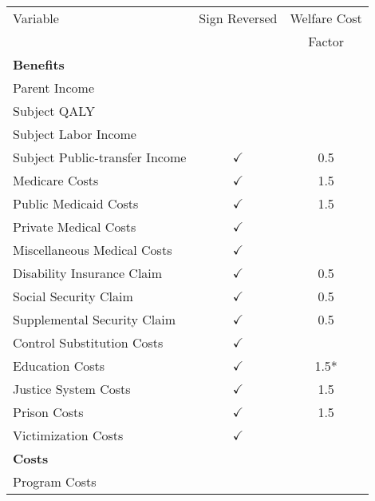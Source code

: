 \begin{tabular}{l c c}
\toprule			
Variable & Sign Reversed	& Welfare Cost \\
	&		& Factor \\
\midrule
\textbf{Benefits} 	\\			
\quad Parent Income			& \\
\quad Subject QALY			& \\
\quad Subject Labor Income	& \\
\quad Subject Public-transfer Income	& $\checkmark$	& 0.5 \\
\quad Medicare Costs			& $\checkmark$	& 1.5 \\
\quad Public Medicaid Costs			& $\checkmark$	& 1.5 \\
\quad Private Medical Costs	& $\checkmark$ \\
\quad Miscellaneous Medical Costs	& $\checkmark$ \\
\quad Disability Insurance Claim	& $\checkmark$	&	0.5 \\
\quad Social Security Claim	& $\checkmark$	&	0.5 \\
\quad Supplemental Security Claim	& $\checkmark$	&	0.5 \\
\quad Control Substitution Costs	& $\checkmark$	& \\
\quad Education Costs			& $\checkmark$	& 1.5* \\
\quad Justice System Costs	& $\checkmark$	& 1.5 \\
\quad Prison Costs			& $\checkmark$	& 1.5 \\
\quad Victimization Costs		& $\checkmark$	& \\
\textbf{Costs} 	\\			
\quad Program Costs			& \\
\bottomrule			
\end{tabular}